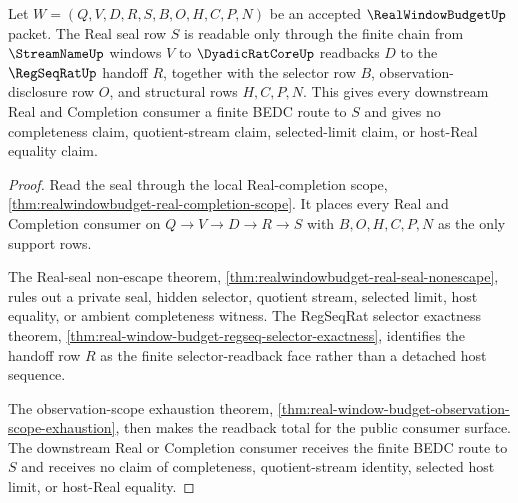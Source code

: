 \begin{theorem}
\label{thm:real-window-budget-real-seal-readback-totality}
Let $W=(Q,V,D,R,S,B,O,H,C,P,N)$ be an accepted $\RealWindowBudgetUp$ packet.
The Real seal row $S$ is readable only through the finite chain from
$\StreamNameUp$ windows $V$ to $\DyadicRatCoreUp$ readbacks $D$ to the
$\RegSeqRatUp$ handoff $R$, together with the selector row $B$,
observation-disclosure row $O$, and structural rows $H,C,P,N$. This gives every
downstream Real and Completion consumer a finite BEDC route to $S$ and gives no
completeness claim, quotient-stream claim, selected-limit claim, or host-Real
equality claim.
\end{theorem}
\begin{proof}
Read the seal through the local Real-completion scope,
\autoref{thm:realwindowbudget-real-completion-scope}. It places every Real and
Completion consumer on $Q \to V \to D \to R \to S$ with $B,O,H,C,P,N$ as the
only support rows.

The Real-seal non-escape theorem,
\autoref{thm:realwindowbudget-real-seal-nonescape}, rules out a private seal,
hidden selector, quotient stream, selected limit, host equality, or ambient
completeness witness. The RegSeqRat selector exactness theorem,
\autoref{thm:real-window-budget-regseq-selector-exactness}, identifies the
handoff row $R$ as the finite selector-readback face rather than a detached
host sequence.

The observation-scope exhaustion theorem,
\autoref{thm:real-window-budget-observation-scope-exhaustion}, then makes the
readback total for the public consumer surface. The downstream Real or
Completion consumer receives the finite BEDC route to $S$ and receives no
claim of completeness, quotient-stream identity, selected host limit, or
host-Real equality.
\end{proof}

